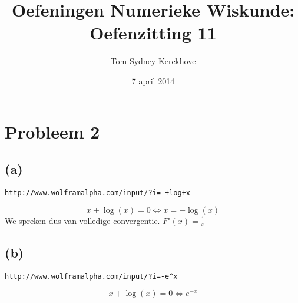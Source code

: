 \documentclass[12pt,a4paper]{article}
\author{Tom Sydney Kerckhove}
\title{Oefeningen Numerieke Wiskunde:\\ Oefenzitting 11}
\date{7 april 2014}
\begin{document}
\maketitle

\section{Probleem 2}
\subsection*{(a)}
\begin{verbatim}
http://www.wolframalpha.com/input/?i=-+log+x
\end{verbatim}
\[
x + \log(x) = 0 \Leftrightarrow x = -\log(x)
\]
We spreken dus van volledige convergentie.
$F'(x) = \frac{1}{x}$

\subsection*{(b)}
\begin{verbatim}
http://www.wolframalpha.com/input/?i=-e^x
\end{verbatim}
\[
x + \log(x) = 0 \Leftrightarrow e^{-x}
\]
\end{document}
